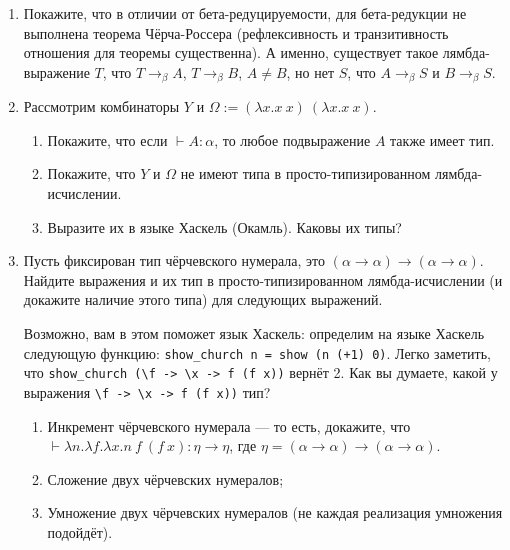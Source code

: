 \documentclass[10pt,a4paper,oneside]{article}
\begin{document}
\begin{enumerate}
\item Покажите, что в отличии от бета-редуцируемости, для бета-редукции не выполнена теорема Чёрча-Россера
(рефлексивность и транзитивность отношения для теоремы существенна).
А именно, существует такое лямбда-выражение $T$, что $T \rightarrow_\beta A$, $T \rightarrow_\beta B$,
$A \ne B$, но нет $S$, что $A \rightarrow_\beta S$ и $B \rightarrow_\beta S$.
\item Рассмотрим комбинаторы $Y$ и $\Omega := (\lambda x.x\ x)\ (\lambda x.x\ x)$.
\begin{enumerate}
\item Покажите, что если $\vdash A : \alpha$, то любое подвыражение $A$ также имеет тип.
\item Покажите, что $Y$ и $\Omega$ не имеют типа в просто-типизированном лямбда-исчислении.
\item Выразите их в языке Хаскель (Окамль). Каковы их типы?
\end{enumerate}


\item Пусть фиксирован тип чёрчевского нумерала, это $(\alpha\rightarrow\alpha)\rightarrow(\alpha\rightarrow\alpha)$.
Найдите выражения и их тип в просто-типизированном лямбда-исчислении (и докажите наличие этого типа) для следующих выражений.

Возможно, вам в этом поможет язык Хаскель: определим на языке Хаскель следующую функцию: \verb!show_church n = show (n (+1) 0)!.
Легко заметить, что \verb!show_church (\f -> \x -> f (f x))! вернёт 2. Как вы думаете, какой у выражения \verb!\f -> \x -> f (f x))! тип?

\begin{enumerate}
\item Инкремент чёрчевского нумерала --- то есть, докажите, что
$\vdash \lambda n.\lambda f.\lambda x.n\ f\ (f\ x) : \eta\rightarrow\eta$, 
где $\eta = (\alpha\rightarrow\alpha)\rightarrow(\alpha\rightarrow\alpha)$.
\item Сложение двух чёрчевских нумералов;
\item Умножение двух чёрчевских нумералов (не каждая реализация умножения подойдёт).
\end{enumerate}



\end{enumerate}
\end{document}
